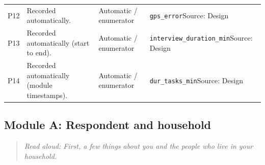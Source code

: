 \documentclass[10pt]{article}
\begin{document}
{\begin{longtable}{p{0.8cm}p{6.4cm}p{3.6cm}p{5.8cm}}
P12 & Recorded automatically. & Automatic / enumerator & \texttt{gps\_error}\newline Source: Design \\
P13 & Recorded automatically (start to end). & Automatic / enumerator & \texttt{interview\_duration\_min}\newline Source: Design \\
P14 & Recorded automatically (module timestamps). & Automatic / enumerator & \texttt{dur\_tasks\_min}\newline Source: Design \\
\bottomrule
\end{longtable}
}
\subsection*{Module A: Respondent and household}
\begin{quote}\small\textit{Read aloud: First, a few things about you and the people who live in your household.}\end{quote}
\end{document}
